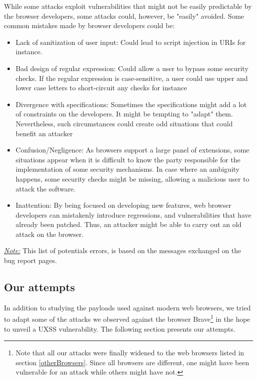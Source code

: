 \documentclass[journal]{IEEEtran}
\begin{document}
\medskip

While some attacks exploit vulnerabilities that might not be easily predictable by the browser developers, some attacks could, however, be "easily" avoided. Some common mistakes made by browser developers could be:

\begin{itemize}
\item Lack of sanitization of user input: Could lead to script injection in URIs for instance.
\item Bad design of regular expression: Could allow a user to bypass some security checks. If the regular expression is case-sensitive, a user could use upper and lower case letters to short-circuit any checks for instance \cite{CVE-2012-0455}
\item Divergence with specifications: Sometimes the specifications might add a lot of constraints on the developers. It might be tempting to "adapt" them. Nevertheless, such circumstances could create odd situations that could benefit an attacker \cite{CVE-2012-3985}
\item Confusion/Negligence: As browsers support a large panel of extensions, some situations appear when it is difficult to know the party responsible for the implementation of some security mechanisms. In case where an ambiguity happens, some security checks might be missing, allowing a malicious user to attack the software.
\item Inattention: By being focused on developing new features, web browser developers can mistakenly introduce regressions, and vulnerabilities that have already been patched. Thus, an attacker might be able to carry out an old attack on the browser.
\end{itemize}

\medskip

\underline{\emph{Note:}} This list of potentials errors, is based on the messages exchanged on the bug report pages. 

\subsection{Our attempts}

In addition to studying the payloads used against modern web browsers, we tried to adapt some of the attacks we observed against the browser Brave\footnote{Note that all our attacks were finally widened to the web browsers listed in section \ref{otherBrowsers}. Since all browsers are different, one might have been vulnerable for an attack while others might have not.} in the hope to unveil a UXSS vulnerability. The following section presents our attempts.
\end{document}
